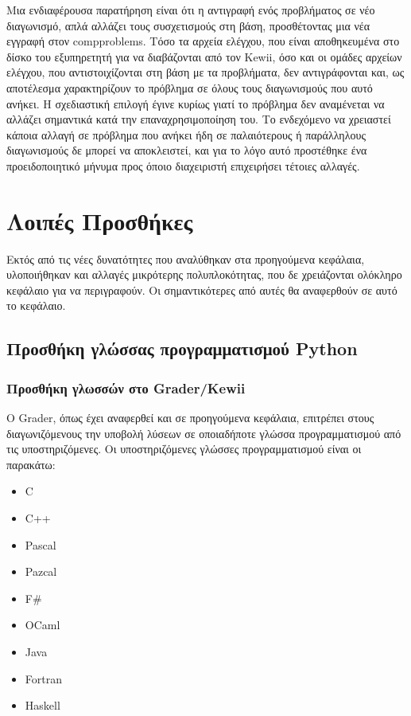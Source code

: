 \documentclass[diploma]{softlab-thesis}
\begin{document}
\bigskip

Μια ενδιαφέρουσα παρατήρηση είναι ότι η αντιγραφή ενός προβλήματος σε νέο
διαγωνισμό, απλά αλλάζει τους συσχετισμούς στη βάση, προσθέτοντας μια νέα
εγγραφή στον compproblems. Τόσο τα αρχεία ελέγχου, που είναι αποθηκευμένα στο
δίσκο του εξυπηρετητή για να διαβάζονται από τον Kewii, όσο και οι ομάδες
αρχείων ελέγχου, που αντιστοιχίζονται στη βάση με τα προβλήματα, δεν
αντιγράφονται και, ως αποτέλεσμα χαρακτηρίζουν το πρόβλημα σε όλους τους
διαγωνισμούς που αυτό ανήκει. Η σχεδιαστική επιλογή έγινε κυρίως γιατί το
πρόβλημα δεν αναμένεται να αλλάζει σημαντικά κατά την επαναχρησιμοποίηση του.
Το ενδεχόμενο να χρειαστεί κάποια αλλαγή σε πρόβλημα που ανήκει ήδη σε
παλαιότερους ή παράλληλους διαγωνισμούς δε μπορεί να αποκλειστεί, και για το
λόγο αυτό προστέθηκε ένα προειδοποιητικό μήνυμα προς όποιο διαχειριστή
επιχειρήσει τέτοιες αλλαγές.

\chapter{Λοιπές Προσθήκες}

Εκτός από τις νέες δυνατότητες που αναλύθηκαν στα προηγούμενα κεφάλαια,
υλοποιήθηκαν και αλλαγές μικρότερης πολυπλοκότητας, που δε χρειάζονται
ολόκληρο κεφάλαιο για να περιγραφούν. Οι σημαντικότερες από αυτές
θα αναφερθούν σε αυτό το κεφάλαιο.

\section{Προσθήκη γλώσσας προγραμματισμού Python}

\subsection{Προσθήκη γλωσσών στο Grader/Kewii}


Ο Grader, όπως έχει αναφερθεί και σε προηγούμενα κεφάλαια, επιτρέπει
στους διαγωνιζόμενους την υποβολή λύσεων σε οποιαδήποτε γλώσσα
προγραμματισμού από τις υποστηριζόμενες. Οι υποστηριζόμενες γλώσσες
προγραμματισμού είναι οι παρακάτω:

\begin{itemize}
    \setlength\itemsep{0em}
    \item C
    \item C++
    \item Pascal
    \item Pazcal
    \item F\#
    \item OCaml
    \item Java
    \item Fortran
    \item Haskell
\end{itemize}
\end{document}
